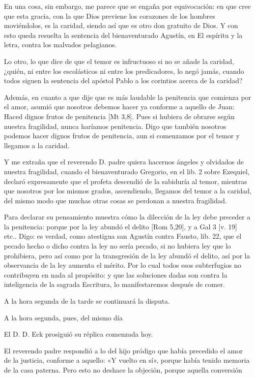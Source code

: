 En una cosa, sin embargo, me parece que se engaña por equivocación: en que cree que esta gracia, con la que Dios previene los corazones de los hombres moviéndolos, es la caridad, siendo así que es otro don gratuito de Dios. Y con esto queda resuelta la sentencia del bienaventurado Agustín, en El espíritu y la letra, contra los malvados pelagianos.

Lo otro, lo que dice de que el temor es infructuoso si no se añade la caridad, ¿quién, ni entre los escolásticos ni entre los predicadores, lo negó jamás, cuando todos siguen la sentencia del apóstol Pablo a los corintios acerca de la caridad?

\marginpar{\small[365]} Además, en cuanto a que dije que es más laudable la penitencia que comienza por el amor, asumió que nosotros debemos hacer ya conforme a aquello de Juan: Haced dignos frutos de penitencia [Mt 3,8]. Pues si hubiera de obrarse según nuestra fragilidad, nunca haríamos penitencia. Digo que también nosotros podemos hacer dignos frutos de penitencia, aun si comenzamos por el temor y llegamos a la caridad.

Y me extraña que el reverendo D. padre quiera hacernos ángeles y olvidados de nuestra fragilidad, cuando el bienaventurado Gregorio, en el lib. 2 sobre Ezequiel, declaró expresamente que el profeta descendió de la sabiduría al temor, mientras que nosotros por los mismos grados, ascendiendo, llegamos del temor a la caridad, del mismo modo que muchas otras cosas se perdonan a nuestra fragilidad.

Para declarar su pensamiento muestra cómo la dilección de la ley debe preceder a la penitencia: porque por la ley abundó el delito [Rom 5,20], y a Gal 3 [v. 19] etc.. Digo: es verdad, como atestigua san Agustín contra Fausto, lib. 22, que el pecado hecho o dicho contra la ley no sería pecado, si no hubiera ley que lo prohibiera, pero así como por la transgresión de la ley abundó el delito, así por la observancia de la ley aumenta el mérito. Por lo cual todos esos subterfugios no contribuyen en nada al propósito: y que las soluciones dadas son contra la inteligencia de la sagrada Escritura, lo manifestaremos después de comer.

A la hora segunda de la tarde se continuará la disputa.

A la hora segunda, pues, del mismo día

El D. D. Eck prosiguió su réplica comenzada hoy.

El reverendo padre respondió a lo del hijo pródigo que había precedido el amor de la justicia, conforme a aquello: «Y vuelto en sí», porque había tenido memoria de la casa paterna. Pero esto no deshace la objeción, porque aquella conversión

